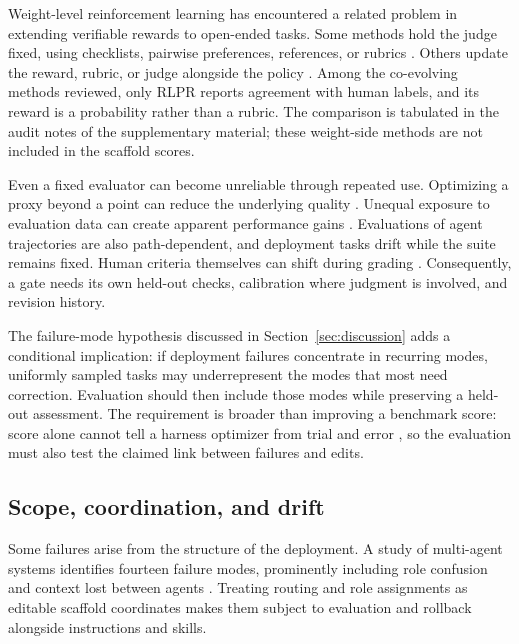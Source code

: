 Weight-level reinforcement learning has encountered a related problem in extending verifiable rewards to open-ended tasks. Some methods hold the judge fixed, using checklists, pairwise preferences, references, or rubrics \citep{gunjal2025rubrics, jia2025writingzero, shi2026references, jin2026rlaes}. Others update the reward, rubric, or judge alongside the policy \citep{yu2025rlpr, xu2026rubricarm, ding2026evorubrics, zhu2026score, li2026rubricem}. Among the co-evolving methods reviewed, only RLPR reports agreement with human labels, and its reward is a probability rather than a rubric. The comparison is tabulated in the audit notes of the supplementary material; these weight-side methods are not included in the scaffold scores.

Even a fixed evaluator can become unreliable through repeated use. Optimizing a proxy beyond a point can reduce the underlying quality \citep{gao2023overoptimization}. Unequal exposure to evaluation data can create apparent performance gains \citep{singh2025leaderboard}. Evaluations of agent trajectories are also path-dependent, and deployment tasks drift while the suite remains fixed. Human criteria themselves can shift during grading \citep{shankar2024validators}. Consequently, a gate needs its own held-out checks, calibration where judgment is involved, and revision history.

The failure-mode hypothesis discussed in Section~\ref{sec:discussion} adds a conditional implication: if deployment failures concentrate in recurring modes, uniformly sampled tasks may underrepresent the modes that most need correction. Evaluation should then include those modes while preserving a held-out assessment. The requirement is broader than improving a benchmark score: score alone cannot tell a harness optimizer from trial and error \citep{ong2026harnesseval}, so the evaluation must also test the claimed link between failures and edits.

\subsection{Scope, coordination, and drift}\label{scope-coordination-and-drift}

Some failures arise from the structure of the deployment. A study of multi-agent systems identifies fourteen failure modes, prominently including role confusion and context lost between agents \citep{cemri2025mast}. Treating routing and role assignments as editable scaffold coordinates makes them subject to evaluation and rollback alongside instructions and skills.

